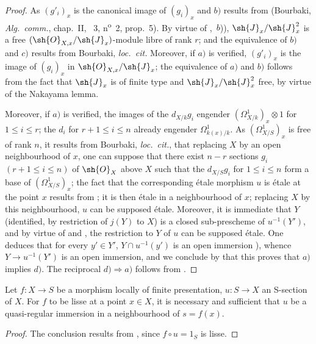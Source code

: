 \begin{proof}
As $(g'_i)_x$ is the canonical image of $(g_i)_x$ and $b)$ results from  (Bourbaki, \emph{Alg.~comm.}, chap.~II, \textsection~3, n\textsuperscript{o}~2, prop.~5).
By virtue of ,~$b$)), $\sh{J}_x/\sh{J}_x^2$ is a free $(\sh{O}_{X,x}/\sh{J}_x)$-module libre of rank $r$; and the equivalence of $b)$ and $c)$ results from Bourbaki, \emph{loc.~cit.}
Moreover, if $a)$ is verified, $(g'_i)_x$ is the image of $(g_i)_x$ in $\sh{O}_{X,x}/\sh{J}_x$; the equivalence of $a)$ and $b)$ follows from the fact that $\sh{J}_x$ is of finite type and $\sh{J}_x/\sh{J}_x^2$ free, by virtue of the Nakayama lemma.


Moreover, if $a)$ is verified, the images of the $d_{X/k} g_i$ engender $(\Omega^1_{X/k})_x\otimes 1$ for $1\leq i\leq r$; the $d_i$ for $r+1\leq i\leq n$ already engender $\Omega^1_{k(x)/k}$.
As $(\Omega^1_{X/S})_x$ is free of rank $n$, it results from Bourbaki, \emph{loc.~cit.}, that replacing $X$ by an open neighbourhood of $x$, one can suppose that there exist $n-r$ sections $g_i$ $(r+1\leq i\leq n)$ of $\sh{O}_X$ above $X$ such that the $d_{X/S} g_i$ for $1\leq i\leq n$ form a base of $(\Omega^1_{X/S})_x$; the fact that the corresponding \'etale morphism $u$ is \'etale at the point $x$ results from ; it is then \'etale in a neighbourhood of $x$; replacing $X$ by this neighbourhood, $u$ can be supposed \'etale.
Moreover, it is immediate that $Y$ (identified, by restriction of $j(Y)$ to $X$) is a closed sub-prescheme of $u^{-1}(Y')$, and by virtue of  and , the restriction to $Y$ of $u$ can be supposed \'etale.
One deduces that for every $y'\in Y'$, $Y\cap u^{-1}(y')$ is an open immersion ), whence $Y\to u^{-1}(Y')$ is an open immersion, and we conclude by  that this proves that $a)$ implies $d)$.
The reciprocal $d)\Rightarrow a)$ follows from .
\end{proof}

\begin{corollary}[17.12.3]
\label{IV.17.12.3}
Let $f:X\to S$ be a morphism locally of finite presentation, $u:S\to X$ an S-section of $X$.
For $f$ to be lisse at a point $x\in X$, it is necessary and sufficient that $u$ be a quasi-regular immersion in a neighbourhood of $s=f(x)$.
\end{corollary}

\begin{proof}
The conclusion results from , since $f\circ u=1_S$ is lisse.
\end{proof}

